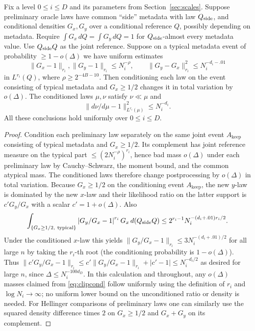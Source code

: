 \begin{lemma}\label{lem:clipping}
Fix a level $0\le i\le D$ and its parameters from Section~\ref{sec:scales}.  Suppose preliminary oracle laws have common
``side'' metadata with law $Q_{\rm side}$, and conditional densities
$G_x,G_y$ over a conditional reference $Q$, possibly depending on
metadata.  Require $\int G_x\,dQ=\int G_y\,dQ=1$ for $Q_{\rm side}$-almost every metadata value.  Use $Q_{\rm side}Q$ as the joint reference. Suppose
on a typical metadata event of probability $\ge1-o(\Delta)$ we have
uniform estimates
\begin{equation}\label{eq:clipcond}
\|G_x-1\|_{r_i},\|G_y-1\|_{r_i}\le N_i^{-\rho},
\qquad \|G_y-G_x\|_{r_i}^2\le N_i^{-d_i-.01}
\end{equation}
in $L^{r_i}(Q)$, where $\rho\ge 2^{-4B-10}$.
Then conditioning each law on the event consisting of typical metadata and $G_x\ge1/2$ changes it in total variation by $o(\Delta)$.  The conditioned laws $\mu,\nu$ satisfy $\nu\ll\mu$ and
\[
 \|d\nu/d\mu-1\|_{L^{r_i}(\mu)}^2\le N_i^{-d_i}.
\]
All these conclusions hold uniformly over $0\le i\le D$.
\end{lemma}

\begin{proof}
Condition each preliminary law separately on the same joint event
$A_{\mathrm{keep}}$ consisting of typical metadata and $G_x\ge1/2$. Its complement has joint reference
measure on the typical part $\le(2N_i^{-\rho})^{r_i}$, hence bad
mass $o(\Delta)$ under each preliminary law by Cauchy--Schwarz,
the moment bound, and the common atypical mass. The conditioned
laws therefore change postprocessing by $o(\Delta)$ in total variation.
Because $G_x\ge1/2$ on the conditioning event $A_{\mathrm{keep}}$,
the new $y$-law is dominated by the new $x$-law and their likelihood
ratio on the latter support is $c' G_y/G_x$ with a scalar
$c'=1+o(\Delta)$. Also
\[
 \int_{\{G_x\ge1/2,\ \mathrm{typical}\}}
  \left|G_y/G_x-1\right|^{r_i} G_x\,d(Q_{\rm side}Q)
 \le 2^{r_i-1} N_i^{-(d_i+.01)r_i/2}.
\]
Under the conditioned $x$-law this yields
$\|G_y/G_x-1\|_{r_i}\le 3 N_i^{-(d_i+.01)/2}$ for all large $n$
by taking the $r_i$-th root (the conditioning probability is $1-o(\Delta)$).
Thus
$\|c'G_y/G_x-1\|_{r_i}\le
c' \|G_y/G_x-1\|_{r_i}+|c'-1|\le N_i^{-d_i/2}$
as desired for large $n$, since $\Delta\le N_i^{-100 d_D}$.
In this calculation and throughout, any $o(\Delta)$ masses claimed
from \eqref{eq:clipcond} follow uniformly using the definition of
$r_i$ and $\log N_i\to\infty$; no uniform lower bound on the
unconditioned ratio or density is needed. For Hellinger comparisons
of preliminary laws one can similarly use the squared density
difference times $2$ on $G_x\ge1/2$ and $G_x+G_y$ on its complement.

\end{proof}
